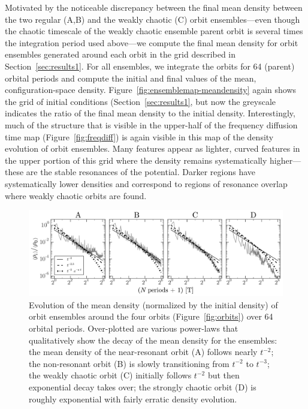 Motivated by the noticeable discrepancy between the final mean density between
the two regular (A,B) and the weakly chaotic (C) orbit ensembles---even though
the chaotic timescale of the weakly chaotic ensemble parent orbit is several
times the integration period used above---we compute the final mean density for
orbit ensembles generated around each orbit in the grid described in
Section~\ref{sec:results1}. For all ensembles, we integrate the orbits for 64
(parent) orbital periods and compute the initial and final values of the mean,
configuration-space density. Figure~\ref{fig:ensemblemap-meandensity} again
shows the grid of initial conditions (Section~\ref{sec:results1}, but now the
greyscale indicates the ratio of the final mean density to the initial density.
Interestingly, much of the structure that is visible in the upper-half of the
frequency diffusion time map (Figure~\ref{fig:freqdiff}) is again visible in
this map of the density evolution of orbit ensembles. Many features appear as
lighter, curved features in the upper portion of this grid where the density
remains systematically higher---these are the stable resonances of the
potential. Darker regions have systematically lower densities and correspond to
regions of resonance overlap where weakly chaotic orbits are found.

\begin{figure}[t]%
\begin{center}
\includegraphics[width=\textwidth]{figures/ch3/ensemble-densities.pdf}
\caption{Evolution of the mean density (normalized by the initial density) of
orbit ensembles around the four orbits (Figure~\ref{fig:orbits}) over 64 orbital
periods. Over-plotted are various power-laws that qualitatively show the decay
of the mean density for the ensembles: the mean density of the near-resonant
orbit (A) follows nearly $t^{-2}$; the non-resonant orbit (B) is slowly
transitioning from $t^{-2}$ to $t^{-3}$; the weakly chaotic orbit (C) initially
follows $t^{-2}$ but then exponential decay takes over; the strongly chaotic
orbit (D) is roughly exponential with fairly erratic density evolution. }
\label{fig:densities}
\end{center}
\end{figure}

